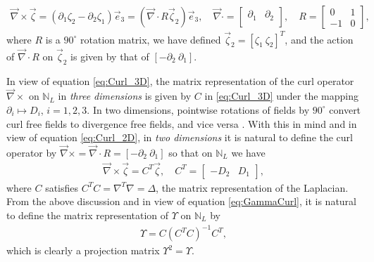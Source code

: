 \documentclass{cmslatex}
\begin{document}
\begin{align}\label{eq:Curl_2D}
  \vec{\nabla}\times\vec{\zeta}=(\partial_1\zeta_2-\partial_2\zeta_1)\vec{e}_3
%  
%  
  =(\vec{\nabla}\cdot R\vec{\zeta}_2)\vec{e}_3,
%
  \quad
%  
  \vec{\nabla}\cdot
    =\left[
    \begin{array}{ccc}
       \partial_1  &   \partial_2 \\      
    \end{array}
  \right],
  \quad
  R=
  \left[
    \begin{array}{ccc}
        0  &  1  \\
       -1  &  0  
    \end{array}
  \right],
\end{align}
%
where $R$ is a $90^\circ$ rotation matrix, we have defined $\vec{\zeta}_2=[\zeta_1
\ \zeta_2]^T$, and the action of $\vec{\nabla}\cdot R$ on $\vec{\zeta}_2$ is given by that
of $[ - \partial_2 \ \partial_1]$. 


In view of equation \eqref{eq:Curl_3D}, the matrix
representation of the curl operator $\vec{\nabla}\times$ on $\mathbb{N}_L$ in
\emph{three dimensions} is given by $C$ in \eqref{eq:Curl_3D} under the
mapping $\partial_i\mapsto D_i$, $i=1,2,3$. In two dimensions, pointwise rotations
of fields by $90^\circ$ convert curl free fields to divergence free
fields, and vice versa \cite{MILTON:2002:TC}. With this in mind and in
view of equation \eqref{eq:Curl_2D}, in \emph{two dimensions} it is
natural to define the curl operator by $\vec{\nabla}\times=\vec{\nabla}\cdot R=[ - \partial_2 \
\partial_1]$ so that on $\mathbb{N}_L$ we have 
%
\begin{align}
  \vec{\nabla}\times\vec{\zeta}=C^T\vec{\zeta}, \quad
  C^T=
  \left[
    \begin{array}{ccc}
       -D_2  &   D_1
    \end{array}
  \right],
\end{align}
%
where $C$ satisfies $C^TC=\nabla^T\nabla=\Delta$, the matrix representation of the
Laplacian. From the above discussion and in view of equation
\eqref{eq:GammaCurl}, it is natural to define the matrix
representation of $\Upsilon$ on $\mathbb{N}_L$ by 
%
\begin{align}\label{eq:GammaCurl_NL}
  \Upsilon=C(C^TC)^{-1}C^T,
\end{align}
%
which is clearly a projection matrix $\Upsilon^2=\Upsilon$.
\end{document}
